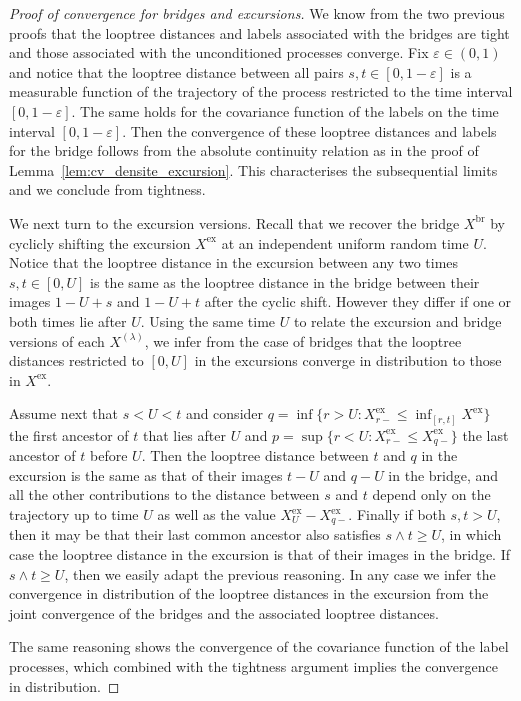 \documentclass[british, a4paper,11pt]{article}
\numberwithin{equation}{section}
\theoremstyle{definition}
\newcommand{\exc}{\mathrm{ex}}
\newcommand{\br}{\mathrm{br}}
\begin{document}
\begin{proof}[Proof of convergence for bridges and excursions]
We know from the two previous proofs that the looptree distances and labels associated with the bridges are tight and those associated with the unconditioned processes converge. 
Fix $\varepsilon \in (0,1)$ and notice that the looptree distance between all pairs $s,t \in [0,1-\varepsilon]$ is a measurable function of the trajectory of the process restricted to the time interval $[0,1-\varepsilon]$. The same holds for the covariance function of the labels on the time interval $[0,1-\varepsilon]$.
Then the convergence of these looptree distances and labels for the bridge follows from the absolute continuity relation as in the proof of Lemma~\ref{lem:cv_densite_excursion}. This characterises the subsequential limits and we conclude from tightness.

We next turn to the excursion versions. Recall that we recover the bridge $X^{\br}$ by cyclicly shifting the excursion $X^{\exc}$ at an independent uniform random time $U$. 
Notice that the looptree distance in the excursion between any two times $s, t \in [0,U]$ is the same as the looptree distance in the bridge between their images $1-U+s$ and $1-U+t$ after the cyclic shift. However they differ if one or both times lie after $U$.
Using the same time $U$ to relate the excursion and bridge versions of each $X^{(\lambda)}$, we infer from the case of bridges that the looptree distances restricted to $[0,U]$ in the excursions converge in distribution to those in $X^{\exc}$.

Assume next that $s < U < t$ and consider $q = \inf\{r > U \colon X^{\exc}_{r-} \leq \inf_{[r,t]} X^{\exc}\}$ the first ancestor of $t$ that lies after $U$ and $p = \sup\{r < U \colon X^{\exc}_{r-} \leq X^{\exc}_{q-}\}$ the last ancestor of $t$ before $U$. Then the looptree distance between $t$ and $q$ in the excursion is the same as that of their images $t-U$ and $q-U$ in the bridge, and all the other contributions to the distance between $s$ and $t$ depend only on the trajectory up to time $U$ as well as the value $X^{\exc}_U - X^{\exc}_{q-}$. 
Finally if both $s, t > U$, then it may be that their last common ancestor also satisfies $s \wedge t \geq U$, in which case the looptree distance in the excursion is that of their images in the bridge. If $s \wedge t \geq U$, then we easily adapt the previous reasoning.
In any case we infer the convergence in distribution of the looptree distances in the excursion from the joint convergence of the bridges and the associated looptree distances.

The same reasoning shows the convergence of the covariance function of the label processes, which combined with the tightness argument implies the convergence in distribution.
\end{proof}
\end{document}
